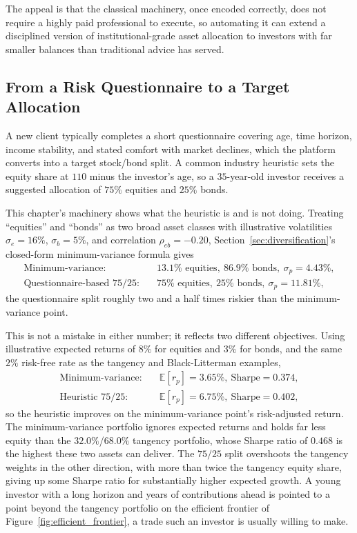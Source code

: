 \documentclass[../ai_in_finance]{subfiles}
\begin{document}
The appeal is that the classical machinery, once encoded correctly, does not require a highly paid professional to execute, so automating it can extend a disciplined version of institutional-grade asset allocation to investors with far smaller balances than traditional advice has served.

\subsection{From a Risk Questionnaire to a Target Allocation}
\label{sec:robo-questionnaire}

A new client typically completes a short questionnaire covering age, time horizon, income stability, and stated comfort with market declines, which the platform converts into a target stock/bond split. A common industry heuristic sets the equity share at $110$ minus the investor's age, so a $35$-year-old investor receives a suggested allocation of $75\%$ equities and $25\%$ bonds.

This chapter's machinery shows what the heuristic is and is not doing. Treating ``equities'' and ``bonds'' as two broad asset classes with illustrative volatilities $\sigma_e = 16\%$, $\sigma_b = 5\%$, and correlation $\rho_{eb} = -0.20$, Section~\ref{sec:diversification}'s closed-form minimum-variance formula gives
\begin{align*}
\text{Minimum-variance:} &\quad 13.1\% \text{ equities}, \ 86.9\% \text{ bonds}, \ \sigma_p = 4.43\%, \\
\text{Questionnaire-based } 75/25\text{:} &\quad 75\% \text{ equities}, \ 25\% \text{ bonds}, \ \sigma_p = 11.81\%,
\end{align*}
the questionnaire split roughly two and a half times riskier than the minimum-variance point.

This is not a mistake in either number; it reflects two different objectives. Using illustrative expected returns of $8\%$ for equities and $3\%$ for bonds, and the same $2\%$ risk-free rate as the tangency and Black-Litterman examples,
\begin{align*}
\text{Minimum-variance:} &\quad \mathbb{E}[r_p] = 3.65\%, \ \text{Sharpe} = 0.374, \\
\text{Heuristic } 75/25\text{:} &\quad \mathbb{E}[r_p] = 6.75\%, \ \text{Sharpe} = 0.402,
\end{align*}
so the heuristic improves on the minimum-variance point's risk-adjusted return. The minimum-variance portfolio ignores expected returns and holds far less equity than the $32.0\%$/$68.0\%$ tangency portfolio, whose Sharpe ratio of $0.468$ is the highest these two assets can deliver. The $75/25$ split overshoots the tangency weights in the other direction, with more than twice the tangency equity share, giving up some Sharpe ratio for substantially higher expected growth. A young investor with a long horizon and years of contributions ahead is pointed to a point beyond the tangency portfolio on the efficient frontier of Figure~\ref{fig:efficient_frontier}, a trade such an investor is usually willing to make.
\end{document}
